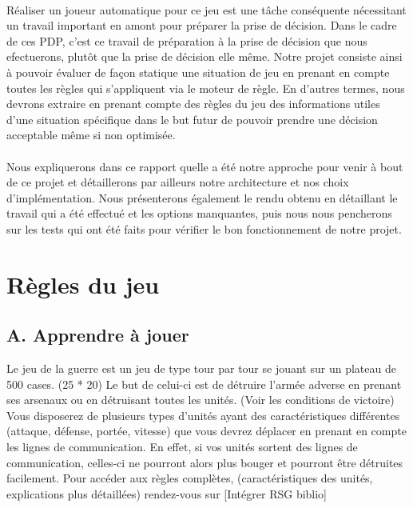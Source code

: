 \documentclass[12pt]{article}
\begin{document}
	\paragraph{}
	Réaliser un joueur automatique pour ce jeu est une tâche conséquente nécessitant un travail important en amont pour préparer la prise de décision.
	Dans le cadre de ces PDP, c'est ce travail de préparation à la prise de décision que nous efectuerons, plutôt que la prise de décision elle même.
	Notre projet consiste ainsi à pouvoir évaluer de façon statique une situation de jeu en prenant en compte toutes les règles qui s'appliquent via le moteur de règle.
	En d'autres termes, nous devrons extraire en prenant compte des règles du jeu des informations utiles d'une situation 
	spécifique dans le but futur de pouvoir prendre une décision acceptable même si non optimisée.
	
	\paragraph{}
	Nous expliquerons dans ce rapport quelle a été notre approche pour venir à bout de ce projet et détaillerons par ailleurs notre architecture et nos
	choix d'implémentation. Nous présenterons également le rendu obtenu en détaillant le travail qui a été effectué et les options manquantes, puis
	nous nous pencherons sur les tests qui ont été faits pour vérifier le bon fonctionnement de notre projet.
	
	\clearpage
	
	\section{Règles du jeu}    

		\subsection{A. Apprendre à jouer}
		
		Le jeu de la guerre est un jeu de type tour par tour se jouant sur un plateau de 500 cases. (25 * 20)
		Le but de celui-ci est de détruire l'armée adverse en prenant ses arsenaux ou en détruisant toutes les unités. (Voir les conditions de victoire)
		Vous disposerez de plusieurs types d'unités ayant des caractéristiques différentes (attaque, défense, portée, vitesse) que vous devrez déplacer 
		en prenant en compte les lignes de communication.
		En effet, si vos unités sortent des lignes de communication, celles-ci ne pourront alors plus bouger et pourront être détruites facilement.
		Pour accéder aux règles complètes, (caractéristiques des unités, explications plus détaillées) rendez-vous sur [Intégrer RSG biblio]
		
\end{document}
